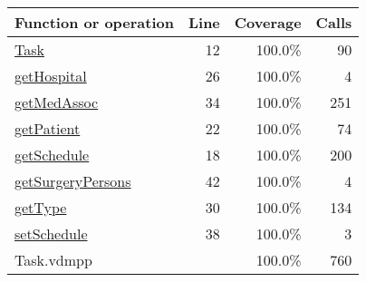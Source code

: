 \begin{longtable}{|l|r|r|r|}
\hline
Function or operation & Line & Coverage & Calls \\
\hline
\hline
\hyperref[Task:12]{Task} & 12&100.0\% & 90 \\
\hline
\hyperref[getHospital:26]{getHospital} & 26&100.0\% & 4 \\
\hline
\hyperref[getMedAssoc:34]{getMedAssoc} & 34&100.0\% & 251 \\
\hline
\hyperref[getPatient:22]{getPatient} & 22&100.0\% & 74 \\
\hline
\hyperref[getSchedule:18]{getSchedule} & 18&100.0\% & 200 \\
\hline
\hyperref[getSurgeryPersons:42]{getSurgeryPersons} & 42&100.0\% & 4 \\
\hline
\hyperref[getType:30]{getType} & 30&100.0\% & 134 \\
\hline
\hyperref[setSchedule:38]{setSchedule} & 38&100.0\% & 3 \\
\hline
\hline
Task.vdmpp & & 100.0\% & 760 \\
\hline
\end{longtable}

